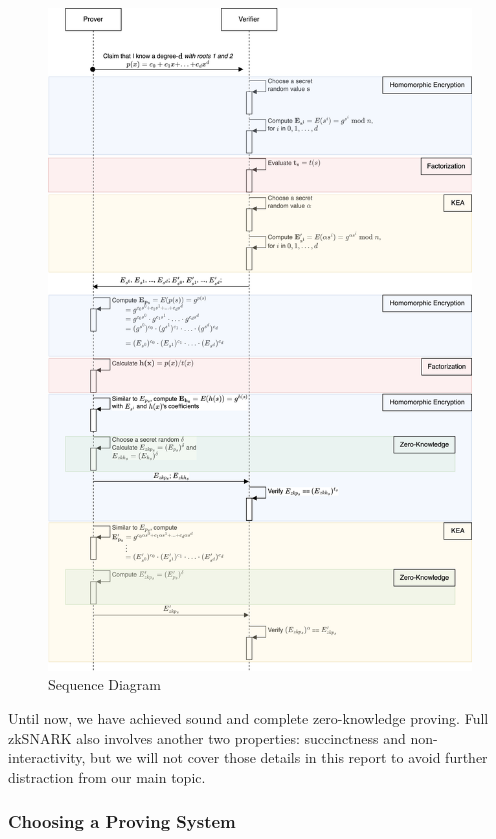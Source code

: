 \documentclass[
]{report}
\begin{document}
\begin{figure}
\centering
\includegraphics{zksnark.png}
\caption{Sequence Diagram}
\end{figure}

Until now, we have achieved sound and complete zero-knowledge proving.
Full zkSNARK also involves another two properties: succinctness
and non-interactivity, but we will not cover those details in this
report to avoid further distraction from our main topic.

\subsubsection{Choosing a Proving System}
\end{document}
